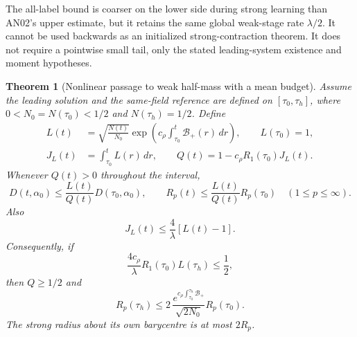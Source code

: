 \documentclass[11pt]{article}
\numberwithin{equation}{section}
\newtheorem{theorem}{Theorem}[section]
\theoremstyle{remark}\newtheorem{remark}[theorem]{Remark}
\newcommand{\dd}{\,d}
\newcommand{\1}{\mathbf 1}
\begin{document}
The all-label bound is coarser on the lower side during strong learning
than AN02's upper estimate, but it retains the same global weak-stage
rate $\lambda/2$. It cannot be used backwards as an initialized
strong-contraction theorem. It does not require a pointwise small tail,
only the stated leading-system existence and moment hypotheses.

\begin{theorem}[Nonlinear passage to weak half-mass with a mean budget]
\label{inc:AN03:ret:v2:halfpassage}
Assume the leading solution and the same-field reference are defined on
$[\tau_0,\tau_h]$, where $0<N_0=N(\tau_0)<1/2$ and $N(\tau_h)=1/2$.
Define
\begin{align}
 L(t)&=\sqrt{\frac{N(t)}{N_0}}
       \exp\left(c_\rho\int_{\tau_0}^t\mathcal B_+(r)\dd r\right),
 \qquad L(\tau_0)=1,\label{inc:AN03:ret:v2:L}\\
 J_L(t)&=\int_{\tau_0}^t L(r)\dd r,
 \qquad Q(t)=1-c_\rho R_1(\tau_0)J_L(t).
 \label{inc:AN03:ret:v2:denominator}
\end{align}
Whenever $Q(t)>0$ throughout the interval,
\begin{equation}\label{inc:AN03:ret:v2:nonlinearG}
 D(t,\alpha_0)\le\frac{L(t)}{Q(t)}D(\tau_0,\alpha_0),
 \qquad
 R_p(t)\le\frac{L(t)}{Q(t)}R_p(\tau_0)
 \quad(1\le p\le\infty).
\end{equation}
Also
\begin{equation}\label{inc:AN03:ret:v2:integralL}
 J_L(t)\le\frac4\lambda[L(t)-1].
\end{equation}
Consequently, if
\begin{equation}\label{inc:AN03:ret:v2:smallness}
 \frac{4c_\rho}{\lambda}R_1(\tau_0)L(\tau_h)\le\frac12,
\end{equation}
then $Q\ge1/2$ and
\begin{equation}\label{inc:AN03:ret:v2:halfradius}
 R_p(\tau_h)\le
 2\,\frac{e^{c_\rho\int_{\tau_0}^{\tau_h}\mathcal B_+}}
          {\sqrt{2N_0}}R_p(\tau_0).
\end{equation}
The strong radius about its own barycentre is at most $2R_p$.
\end{theorem}
\end{document}
